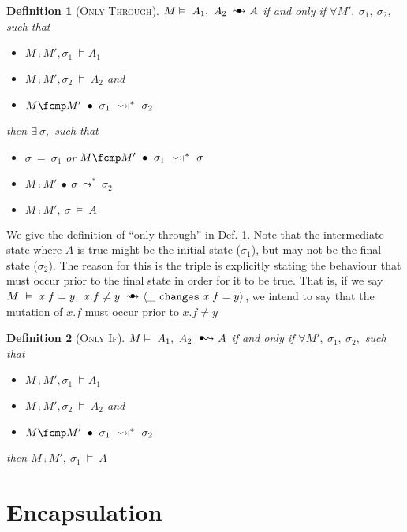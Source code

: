 \documentclass[12pt]{article}
\newcommand{\constrained}{\mathrel{\leadsto\ \!\!\!\!{\raisebox{1pt}{$\mathsmaller{\mathsmaller{\mathsmaller{\mathsmaller\rvert}}}$}}}}
\newcommand\trans{\mathlarger{\mathlarger \leadsto}}
\newcommand\oi{\hspace{1mm}{\raisebox{1pt}{$\bullet$}}\hspace{-1mm}{\trans}}
\newcommand\ot{\hspace{2mm}{\raisebox{1pt}{$\bullet$}}\hspace{-3mm}{\trans}}
\newcommand\onlyIf[3]{#1,\ #2\ \oi\ #3}
\newcommand\onlyThrough[3]{#1,\ #2\ \ot\ #3}
\newcommand\changes[2]{\langle #1\ \texttt{changes}\ #2 \rangle}
\newtheorem{definition}{Definition}
\numberwithin{case}{lemma}
\numberwithin{case}{theorem}
\numberwithin{subcase}{case}
\begin{document}
\begin{definition}[\textsc{Only Through}]
\label{def:ot}
$M \vDash\ \onlyThrough {A_1}{A_2}{A}$ if and only if
$\forall M',\ \sigma_1,\ \sigma_2,$ such that 
\begin{itemize}
\item
$M \fcmp M', \sigma_1\ \vDash A_1$
\item
$M \fcmp M', \sigma_2\ \vDash\ A_2$ and
\item
$M \fcmp M'\ \bullet\ \sigma_1\ \constrained^*\ \sigma_2$
\end{itemize}
then $\exists\ \sigma,$ such that
\begin{itemize}
\item
$\sigma\ =\ \sigma_1$ or $M \fcmp M'\ \bullet\ \sigma_1\ \constrained^*\ \sigma$
\item
$M \fcmp M'\ \bullet\ \sigma\ \leadsto^*\ \sigma_2$
\item
$M \fcmp M',\ \sigma\ \vDash\ A$
\end{itemize}
\end{definition}
We give the definition of ``only  through'' in Def. \ref{def:ot}. Note 
that the intermediate state where $A$ is true might be the initial state ($\sigma_1$),
but may not be the final state ($\sigma_2$). The reason for this is
the triple is explicitly stating the behaviour that must occur prior to
the final state in order for it to be true. That is, 
if we say $M\ \vDash\ \onlyThrough{x.f=y}{x.f \neq y}{\changes{\_}{x.f=y}}$,
we intend to say that the mutation of $x.f$ must occur prior to $x.f\neq y$

\begin{definition}[\textsc{Only If}]
\label{def:oi}
$M \vDash\ \onlyIf {A_1}{A_2}{A}$ if and only if
$\forall M',\ \sigma_1,\ \sigma_2,$ such that 
\begin{itemize}
\item
$M \fcmp M', \sigma_1\ \vDash A_1$
\item
$M \fcmp M', \sigma_2\ \vDash\ A_2$ and
\item
$M \fcmp M'\ \bullet\ \sigma_1\ \constrained^*\ \sigma_2$
\end{itemize}
then $M \fcmp M',\ \sigma_1\ \vDash\ A$
\end{definition}

\section{Encapsulation}
\end{document}
